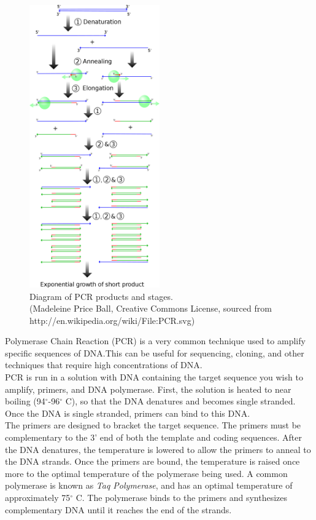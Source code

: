 \documentclass{article}
\begin{document}
\begin{figure}[h!]
    \begin{center}
        \includegraphics[width=0.5\textwidth]{images/pcr.png}
    \end{center}
    \caption{
        Diagram of PCR products and stages. \\\small (Madeleine Price Ball, Creative Commons License,
        sourced from http://en.wikipedia.org/wiki/File:PCR.svg)
    }
\end{figure}

Polymerase Chain Reaction (PCR) is a very common technique used to amplify specific sequences of
DNA.\@ This can be useful for sequencing, cloning, and other techniques that require high
concentrations of DNA.\@ \\

PCR is run in a solution with DNA containing the target sequence you wish to amplify, primers, and
DNA polymerase. First, the solution is heated to near boiling (94$^\circ$-96$^\circ$ C), so that the
DNA denatures and becomes single stranded. Once the DNA is single stranded, primers can bind to this
DNA.\@\\

The primers are designed to bracket the target sequence. The primers must be complementary to the 3'
end of both the template and coding sequences. After the DNA denatures, the temperature is lowered
to allow the primers to anneal to the DNA strands. Once the primers are bound, the temperature is
raised once more to the optimal temperature of the polymerase being used. A common polymerase is
known as \emph{Taq Polymerase}, and has an optimal temperature of approximately 75$^\circ$ C. The
polymerase binds to the primers and synthesizes complementary DNA until it reaches the end of the
strands. \\
\end{document}
